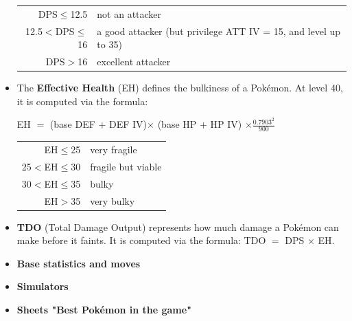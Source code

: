 \documentclass[12pt]{beamer}
\begin{document}
\begin{frame}
\begin{block}{}
\begin{footnotesize}
\begin{itemize}
\begin{center}
\begin{tabular}{rl}
DPS$\leq$12.5   &  not an attacker  \\
12.5$<$DPS$\leq$16   &  a good attacker (but privilege ATT IV = 15, and level up to 35)  \\
DPS$>$16   &  excellent attacker  \\
\end{tabular}
\end{center}
  \item The \textbf{Effective Health} (EH) defines the bulkiness of a Pok\'emon. At level 40, it is computed via the formula:
\begin{center}
EH $=$ (base DEF + DEF IV)$\times$ (base HP + HP IV) $\times \frac{0.7903^2}{900}$
\end{center}
\begin{center}
\begin{tabular}{rl}
EH$\leq$25   &  very fragile  \\
25$<$EH$\leq$30   &  fragile but viable  \\
30$<$EH$\leq$35   &  bulky  \\
EH$>$35   &  very bulky  \\
\end{tabular}
\end{center}
\item \textbf{TDO} (Total Damage Output) represents how much damage a Pok\'emon can make before it faints. It is computed via the formula: 
TDO $=$ DPS $\times$ EH.
\item \textbf{Base statistics and moves}

\begin{center}
   \href{https://pokemongo.gamepress.gg/}{} \quad \quad 
   \href{https://pokegocomplete.com}{}
\end{center}

\item \textbf{Simulators}
   
\begin{center}
   \href{https://pokemongo.gamepress.gg/comprehensive-dps-spreadsheet}{}  \quad \quad 
   \href{https://www.pokebattler.com}{} 
\end{center}

\item \textbf{Sheets  "Best Pokémon in the game"}
\begin{center}
   \href{https://imgur.com/a/1nSSUqM}{}
   \end{center}
\end{itemize}

\end{footnotesize}
\end{block}
\end{frame}
\end{document}

